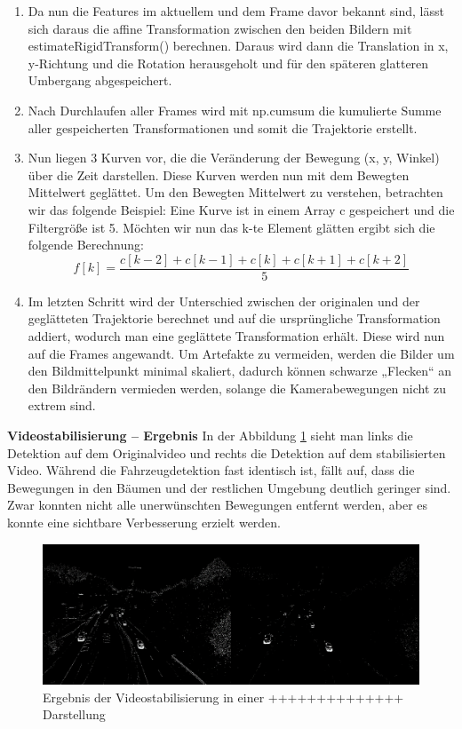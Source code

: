 \documentclass[conference]{IEEEtran}
\begin{document}
\begin{enumerate}
		\item Da nun die Features im aktuellem und dem Frame davor bekannt sind, lässt sich daraus die affine Transformation zwischen den beiden Bildern mit estimateRigidTransform() berechnen. Daraus wird dann die Translation in x, y-Richtung und die Rotation herausgeholt und für den späteren glatteren Umbergang abgespeichert.
		
		\item Nach Durchlaufen aller Frames wird mit np.cumsum die kumulierte Summe aller gespeicherten Transformationen und somit die Trajektorie erstellt.
		
		\item Nun liegen 3 Kurven vor, die die Veränderung der Bewegung (x, y, Winkel) über die Zeit darstellen. Diese Kurven werden nun mit dem Bewegten Mittelwert geglättet. Um den Bewegten Mittelwert zu verstehen, betrachten wir das folgende Beispiel: 
		Eine Kurve ist in einem Array c gespeichert und die Filtergröße ist 5. Möchten wir nun das k-te Element glätten ergibt sich die folgende Berechnung:
		\[ f[k] = \frac{c[k-2]+c[k-1]+c[k]+c[k+1]+c[k+2]}{5} \]
		
		\item Im letzten Schritt wird der Unterschied zwischen der originalen und der geglätteten Trajektorie berechnet und auf die ursprüngliche Transformation addiert, wodurch man eine geglättete Transformation erhält. Diese wird nun auf die Frames angewandt. Um Artefakte zu vermeiden, werden die Bilder um den Bildmittelpunkt minimal skaliert, dadurch können schwarze „Flecken“ an den Bildrändern vermieden werden, solange die Kamerabewegungen nicht zu extrem sind.
		
	\end{enumerate}
	
	\textbf{Videostabilisierung – Ergebnis}
	In der Abbildung \ref{VS3} sieht man links die Detektion auf dem Originalvideo und rechts die Detektion auf dem stabilisierten Video. Während die Fahrzeugdetektion fast identisch ist, fällt auf, dass die Bewegungen in den Bäumen und der restlichen Umgebung deutlich geringer sind. Zwar konnten nicht alle unerwünschten Bewegungen entfernt werden, aber es konnte eine sichtbare Verbesserung erzielt werden.
	\begin{figure}[!h]
		\begin{center}
			\includegraphics[width=16cm]{Media/VideoStab3E.png}
			\caption{Ergebnis der Videostabilisierung in einer ++++++++++++++ Darstellung}
			\label{VS3}
		\end{center}
	\end{figure}
	
\end{document}
